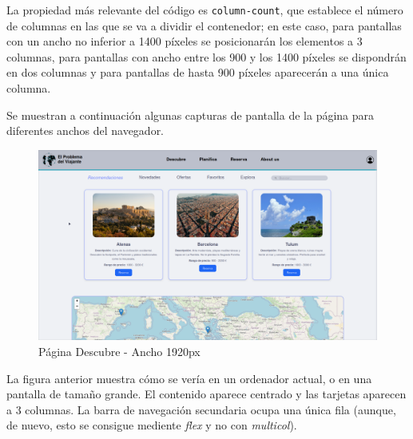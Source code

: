 \documentclass[11pt, a4paper]{book}
\begin{document}
    La propiedad más relevante del código es \texttt{column-count}, que establece el número de columnas en las que se va a dividir el contenedor; en este caso, para pantallas con un ancho no inferior a 1400 píxeles se posicionarán los elementos a 3 columnas, para pantallas con ancho entre los 900 y los 1400 píxeles se dispondrán en dos columnas y para pantallas de hasta 900 píxeles aparecerán a una única columna.
 
    Se muestran a continuación algunas capturas de pantalla de la página para diferentes anchos del navegador.

	\begin{figure} [H]
		\centering
		\includegraphics[width=\textwidth]{CSS/4-1 1920.png}
		\caption{Página Descubre - Ancho 1920px}
	\end{figure}

    La figura anterior muestra cómo se vería en un ordenador actual, o en una pantalla de tamaño grande. El contenido aparece centrado y las tarjetas aparecen a 3 columnas. La barra de navegación secundaria ocupa una única fila (aunque, de nuevo, esto se consigue mediente \textit{flex} y no con \textit{multicol}).
\end{document}

